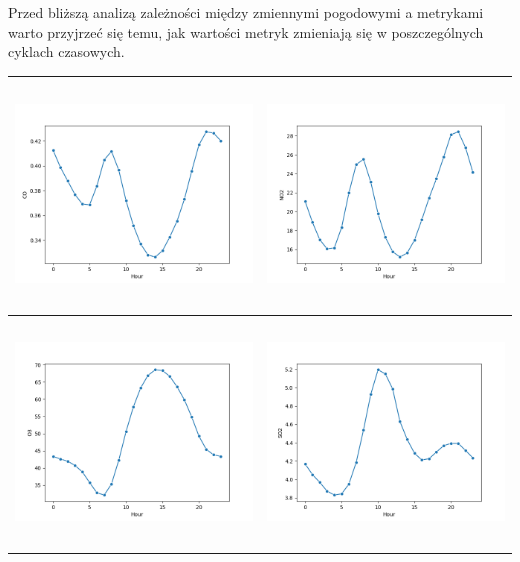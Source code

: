 \documentclass[18pt, letterpaper]{article}
\begin{document}
Przed bliższą analizą zależności między zmiennymi pogodowymi a metrykami warto przyjrzeć się temu, jak wartości metryk zmieniają się w poszczególnych cyklach czasowych.

\begin{table}[H]
\centering
\begin{tabular}{|c|c|}
\hline
\includegraphics[width=80mm,height=60mm]{visualisations/cycles/hourly_CO.png}  & \includegraphics[width=80mm,height=60mm]{visualisations/cycles/hourly_NO2.png} \\ \hline
\includegraphics[width=80mm,height=60mm]{visualisations/cycles/hourly_O3.png}  & \includegraphics[width=80mm,height=60mm]{visualisations/cycles/hourly_SO2.png} \\ \hline

\end{tabular}
\end{table}
\end{document}
